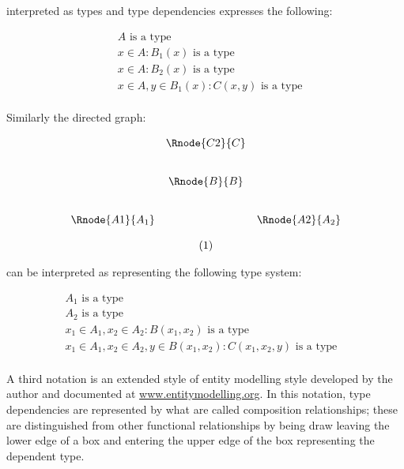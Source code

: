 \documentclass[10pt,a4paper]{article}
\begin{document}
\noindent interpreted as types and type dependencies expresses the following:
\addtocounter{equation}{-1}
\begin{subequations}
\begin{align}
&A\mbox{ is a type} \\
&x\in A : B_1(x) \mbox{ is a type} \\
&x\in A : B_2(x) \mbox{ is a type} \\
&x\in A, y\in B_1(x): C(x,y) \mbox{ is a type}
\end{align}
\end{subequations}
\\

\noindent Similarly the directed graph:

\begin{center}
$
\begin{array}{p{1.5cm}cccp{2cm}c}
&                & \Rnode{C2}{C}&   \\ [0.8cm]
&                & \Rnode{B}{B} &  \\ [0.8cm]
&\Rnode{A1}{A_1} &              & \Rnode{A2}{A_2}\\ [0.4cm]
&                &\stepcounter{equation}(\theequation) &  \\
\end{array}
$
\setlength {\saroffsetA}{-2pt}
\setlength {\saroffsetB}{-2pt}
\setlength {\saroffsetA}{2pt}
\setlength {\saroffsetB}{2pt}
\sarreset
{}
\end{center}

\noindent can be interpreted as representing the following type system:

\addtocounter{equation}{-1}
\begin{align}
&A_1\mbox{ is a type} && \tag*{(\theequation a)}\\
&A_2\mbox{ is a type} && \tag*{(\theequation b)}\\
&x_1\in A_1, x_2 \in A_2 : B(x_1,x_2) \mbox{ is a type} && \tag*{(\theequation c)}\\
&x_1\in A_1, x_2 \in A_2, y \in B(x_1,x_2): C(x_1,x_2,y) \mbox{ is a type} && \tag*{(\theequation d)}\\
\end{align}

\noindent 
A third notation is an extended style of entity modelling style developed by the author and documented at \href{www.entitymodelling.org}{www.entitymodelling.org}. In this notation, type dependencies are represented by what are called composition relationships; these are distinguished from other functional relationships by being draw leaving the
lower edge of a box and entering the upper edge of the box representing the dependent type. \\
\end{document}
